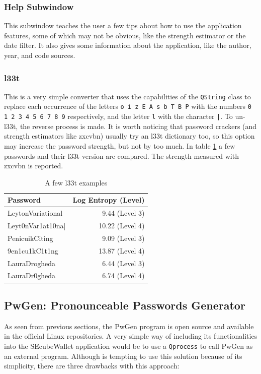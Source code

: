\subsubsection*{Help Subwindow}

This subwindow teaches the user a few tips about how to use the application features, some of which may not be obvious, like the strength estimator or the date filter. It also  gives some information about the application, like the author, year, and code sources.



\subsubsection*{l33t} \label{sec:l33t}

This is a very simple converter that uses the capabilities of the \texttt{QString} class to replace each occurrence of the letters \texttt{o i z E A s b T B P} with the numbers \texttt{0 1 2 3 4 5 6 7 8 9} respectively, and the letter \texttt{l} with the character \texttt{|}. To un-l33t, the reverse process is made. It is worth noticing that password crackers (and strength estimators like zxcvbn) usually try an l33t dictionary too, so this option may increase the password strength, but not by too much. In table \ref{tab:l33t} a few passwords and their l33t version are compared. The strength measured with zxcvbn is reported.

\begin{table}[ht]
\renewcommand{\arraystretch}{1.3}
\centering
\caption{A few l33t examples}
\begin{tabular}{lr}
\toprule
\textbf{Password} & \textbf{Log Entropy (Level)} \\ \midrule

LeytonVariational & 9.44 (Level 3) \\
Leyt0nVar1at10na| & 10.22 (Level 4) \\
\midrule
PenicuikCiting & 9.09 (Level 3) \\
9en1cu1kC1t1ng & 13.87 (Level 4) \\
\midrule
LauraDrogheda & 6.44 (Level 3) \\
LauraDr0gheda & 6.74 (Level 4) \\

\bottomrule
\end{tabular}
\label{tab:l33t}
\end{table}

\subsection{PwGen: Pronounceable Passwords Generator} \label{sec:pwgen}
As seen from previous sections, the PwGen program is open source and available in the official Linux repositories. A very simple way of including its functionalities into the SEcubeWallet application would be to use a \texttt{Qprocess} to call PwGen as an external program. Although is tempting to use this solution because of its simplicity, there are three drawbacks with this approach:

